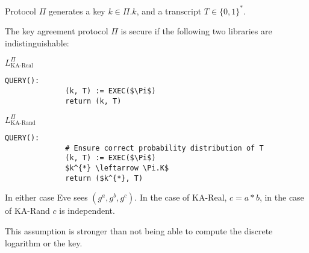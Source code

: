 \documentclass[a4paper]{scrreprt}
\begin{document}
Protocol $\Pi$ generates a key $k \in \Pi.k$, and a transcript $T \in \{0,
1\}^{*}$.

The key agreement protocol $\Pi$ is secure if the following two libraries are
indistinguishable:


\begin{tcbraster}[raster columns=2,raster equal height,nobeforeafter,raster column skip=2cm]
	\begin{library}{$L^\Pi_{\text{KA-Real}}$}
		\begin{lstlisting}[mathescape=true,autogobble=true]
			QUERY():
			  (k, T) := EXEC($\Pi$)
			  return (k, T)
		\end{lstlisting}
	\end{library}
	\begin{library}{$L^\Pi_{\text{KA-Rand}}$}
		\begin{lstlisting}[mathescape=true,autogobble=true]
			QUERY():
			  # Ensure correct probability distribution of T
			  (k, T) := EXEC($\Pi$)
			  $k^{*} \leftarrow \Pi.K$
			  return ($k^{*}, T)
		\end{lstlisting}
	\end{library}
\end{tcbraster}

In either case Eve sees $(g^a, g^b, g^c)$. In the case of KA-Real, $c = a*b$,
in the case of KA-Rand $c$ is independent.

This assumption is stronger than not being able to compute the discrete
logarithm or the key.
\end{document}
